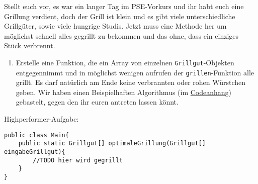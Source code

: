 \documentclass{../../sheet}
\begin{document}
\newpage
{}
Stellt euch vor, es war ein langer Tag im PSE-Vorkurs und ihr habt euch eine Grillung verdient, doch der Grill ist klein und es gibt viele unterschiedliche Grillgüter, sowie viele hungrige Studis. Jetzt muss eine Methode her um möglichst schnell alles gegrillt zu bekommen und das ohne, dass ein einziges Stück verbrennt.
\begin{enumerate}
    \item Erstelle eine Funktion, die ein Array von einzelnen \texttt{Grillgut}-Objekten entgegennimmt und in möglichst wenigen aufrufen der \texttt{grillen}-Funktion alle grillt. Es darf natürlich am Ende keine verbrannten oder rohen Würstchen geben. Wir haben einen Beispielhaften Algorithmus (im \hyperlink{Highperformer}{Codeanhang}) gebastelt, gegen den ihr euren antreten lassen könnt. 
\end{enumerate}

\newpage
{}
Highperformer-Aufgabe:
\hypertarget{Highperformer}{}
\begin{verbatim}
public class Main{
    public static Grillgut[] optimaleGrillung(Grillgut[] eingabeGrillgut){
        //TODO hier wird gegrillt
    }
}
\end{verbatim}
\end{document}
